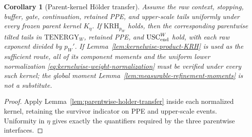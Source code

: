 \documentclass[11pt]{article}
\newtheorem{corollary}[theorem]{Corollary}
\begin{document}
\begin{corollary}[Parent-kernel H\"older transfer]
\label{cor:parent-kernel-holder-energy}
Assume the raw context, stopping, buffer, gate, continuation, retained PPE,
and upper-scale tails uniformly under every frozen parent kernel $K_\eta$.
If \(\mathrm{KRH}_{p_W}\) holds, then the corresponding parentwise tilted
tails in \(\mathrm{TENERGY}_{W}\), retained PPE, and
\(\mathrm{USC}_{\rm end}^{W}\) hold, with each raw exponent divided by
$p_W'$.  If Lemma~\ref{lem:kernelwise-product-KRH} is used as the sufficient
route, all of its component moments and the uniform lower normalization
\eqref{eq:kernelwise-weight-normalization} must be verified under every such
kernel; the global moment Lemma~\ref{lem:measurable-refinement-moments} is
not a substitute.
\end{corollary}

\begin{proof}
Apply Lemma~\ref{lem:parentwise-holder-transfer} inside each normalized
kernel, retaining the survivor indicator on PPE and upper-scale events.
Uniformity in $\eta$ gives exactly the quantifiers required by the three
parentwise interfaces.
\end{proof}
\end{document}
